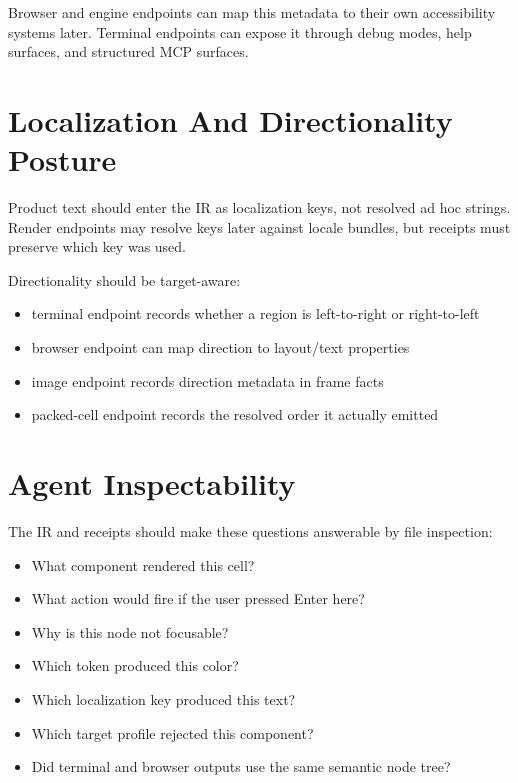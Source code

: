 Browser and engine endpoints can map this metadata to their own accessibility systems later. Terminal endpoints can expose it through debug modes, help surfaces, and structured MCP surfaces.

\section{Localization And Directionality Posture}\label{record-139-localization-and-directionality-posture}

Product text should enter the IR as localization keys, not resolved ad hoc strings. Render endpoints may resolve keys later against locale bundles, but receipts must preserve which key was used.

Directionality should be target-aware:

\begin{itemize}
\tightlist
\item
  terminal endpoint records whether a region is left-to-right or right-to-left
\item
  browser endpoint can map direction to layout/text properties
\item
  image endpoint records direction metadata in frame facts
\item
  packed-cell endpoint records the resolved order it actually emitted
\end{itemize}

\section{Agent Inspectability}\label{record-139-agent-inspectability}

The IR and receipts should make these questions answerable by file inspection:

\begin{itemize}
\tightlist
\item
  What component rendered this cell?
\item
  What action would fire if the user pressed Enter here?
\item
  Why is this node not focusable?
\item
  Which token produced this color?
\item
  Which localization key produced this text?
\item
  Which target profile rejected this component?
\item
  Did terminal and browser outputs use the same semantic node tree?
\end{itemize}

